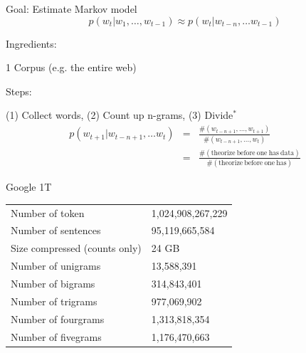 \documentclass{beamer}
\let\tempone\itemize
\let\temptwo\enditemize
\renewenvironment{itemize}{\tempone\addtolength{\itemsep}{0.5\baselineskip}}{\temptwo}
\begin{document}
\begin{frame}

Goal: Estimate Markov model 
\[ p(w_{t} | w_{1}, \ldots, w_{t-1}) \approx p(w_{t} | w_{t-n}, \ldots w_{t-1})\] 

Ingredients: 

\begin{itemize}
\item 1 Corpus (e.g. the entire web)

\end{itemize}

Steps:

\begin{itemize}
\item (1) Collect words, (2) Count up n-grams, (3) Divide$^*$
  \begin{eqnarray*} 
    p(w_{t+1} | w_{t-n+1}, \ldots w_{t}) &=& \frac{\#( w_{t-n+1}, \ldots, w_{t+1}) }{\#( w_{t-n+1}, \ldots, w_{t})} \\
    &=&  \frac{\#(\mathrm{theorize\ before\ one\ has\ data})}{\#(\mathrm{theorize\ before\ one\ has})}
    \end{eqnarray*}
\end{itemize}
\end{frame}

\begin{frame}
  \begin{center}
    \alert{Google 1T}

  \end{center}
  \begin{table}
    \centering
  \begin{tabular}{ll}
    \toprule
    Number of token  &1,024,908,267,229 \\
    Number of sentences & 95,119,665,584 \\
    Size compressed (counts only) & 24 GB \\  
    \midrule
    Number of unigrams & 13,588,391 \\
    Number of bigrams & 314,843,401 \\ 
    Number of trigrams & 977,069,902 \\ 
    Number of fourgrams & 1,313,818,354 \\
    Number of fivegrams&  1,176,470,663 \\
    \bottomrule
  \end{tabular}
  \end{table}


\end{frame}
\end{document}
